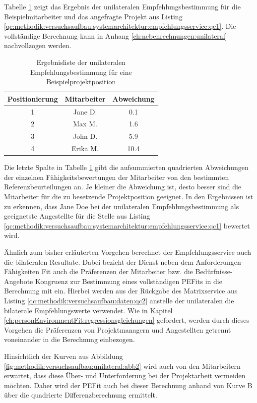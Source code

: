 Tabelle \ref{tbl:methodik:versuchsaufbau:unilateral:tbl2} zeigt das Ergebnis der unilateralen Empfehlungsbestimmung für die Beispielmitarbeiter und das angefragte Projekt aus Listing \ref{qc:methodik:versuchsaufbau:systemarchitektur:empfehlungsservice:qc1}. Die vollständige Berechnung kann in Anhang \ref{ch:nebenrechnungen:unilateral} nachvollzogen werden.

\begin{table}[h]
	\centering
	\begin{tabular}{c|c|c}
		\textbf{Positionierung} & \textbf{Mitarbeiter} & \textbf{Abweichung}\\
		\hline
		1 & Jane D.  & 0.1\\
		2 & Max M.   & 1.6\\
		3 & John D.  & 5.9\\
		4 & Erika M. & 10.4
	\end{tabular}
	\caption{Ergebnisliste der unilateralen Empfehlungsbestimmung für eine Beispielprojektposition}
	\label{tbl:methodik:versuchsaufbau:unilateral:tbl2}
\end{table}
\newpage
Die letzte Spalte in Tabelle \ref{tbl:methodik:versuchsaufbau:unilateral:tbl2} gibt die aufsummierten quadrierten Abweichungen der einzelnen Fähigkeitsbewertungen der Mitarbeiter von den bestimmten Referenzbeurteilungen an. Je kleiner die Abweichung ist, desto besser sind die Mitarbeiter für die zu besetzende Projektposition geeignet. In den Ergebnissen ist zu erkennen, dass Jane Doe bei der unilateralen Empfehlungsbestimmung als geeignetste Angestellte für die Stelle aus Listing \ref{qc:methodik:versuchsaufbau:systemarchitektur:empfehlungsservice:qc1} bewertet wird.

Ähnlich zum bisher erläuterten Vorgehen berechnet der Empfehlungsservice auch die bilateralen Resultate. Dabei bezieht der Dienst neben dem Anforderungen-Fähigkeiten Fit auch die Präferenzen der Mitarbeiter bzw. die Bedürfnisse-Angebote Kongruenz zur Bestimmung eines vollständigen \acp{PEFit} in die Berechnung mit ein. Hierbei werden aus der Rückgabe des Matrixservice aus Listing \ref{qc:methodik:versuchsaufbau:daten:qc2} anstelle der unilateralen die bilaterale Empfehlungswerte verwendet. Wie in Kapitel \ref{ch:personEnvironmentFit:regressionsgleichungen} gefordert, werden durch dieses Vorgehen die Präferenzen von Projektmanagern und Angestellten getrennt voneinander in die Berechnung einbezogen.

Hinsichtlich der Kurven aus Abbildung \ref{fig:methodik:versuchsaufbau:unilateral:abb2} wird auch von den Mitarbeitern erwartet, dass diese Über- und Unterforderung bei der Projektarbeit vermeiden möchten. Daher wird der \ac{PEFit} auch bei dieser Berechnung anhand von Kurve B über die quadrierte Differenzberechnung ermittelt.

